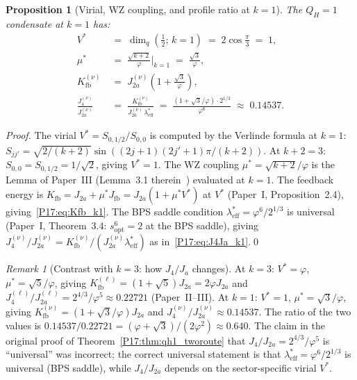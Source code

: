 \documentclass[11pt,a4paper]{article}
\newtheorem{proposition}[theorem]{Proposition}
\theoremstyle{definition}\newtheorem{definition}[theorem]{Definition}
\theoremstyle{remark}
\newtheorem{remark}[theorem]{Remark}
\newcommand{\vp}{\varphi}
\newcommand{\Ja}{J_{2a}}
\newcommand{\Jfour}{J_4}
\newcommand{\QH}{Q_H}
\begin{document}
\begin{proposition}[Virial, WZ coupling, and profile ratio at $k=1$]
\label{P17:prop:k1_virial}
The $\QH=1$ condensate at $k=1$ has:
\begin{align}
  V^* &\;=\; \dim_q\!\left(\tfrac12;\,k{=}1\right)
           \;=\; 2\cos\tfrac{\pi}{3} \;=\; 1,
  \label{P17:eq:Vstar_k1} \\
  \mu^* &\;=\; \frac{\sqrt{k+2}}{\vp}\bigg|_{k=1}
             \;=\; \frac{\sqrt{3}}{\vp},
  \label{P17:eq:mustar_k1} \\
  K_{\mathrm{fb}}^{(\nu)} &\;=\; \Ja^{(\nu)}\!\left(1+\frac{\sqrt{3}}{\vp}\right),
  \label{P17:eq:Kfb_k1} \\
  \frac{\Jfour^{(\nu)}}{\Ja^{(\nu)}}
  &\;=\; \frac{K_{\mathrm{fb}}^{(\nu)}}{\Ja^{(\nu)}\,\lambda_{\mathrm{eff}}^*}
   \;=\; \frac{(1+\sqrt{3}/\vp)\cdot2^{1/3}}{\vp^6}
   \;\approx\; 0.14537.
  \label{P17:eq:J4Ja_k1}
\end{align}
\end{proposition}

\begin{proof}
The virial $V^*=S_{0,1/2}/S_{0,0}$ is computed by the Verlinde
formula at $k=1$: $S_{jj'}=\sqrt{2/(k+2)}\sin((2j+1)(2j'+1)\pi/(k+2))$.
At $k+2=3$: $S_{0,0}=S_{0,1/2}=1/\sqrt{2}$, giving $V^*=1$.
The WZ coupling $\mu^*=\sqrt{k+2}/\vp$ is the Lemma of Paper~III
(Lemma~3.1 therein~\cite{Paper3}) evaluated at $k=1$.
The feedback energy is $K_{\mathrm{fb}}=\Ja+\mu^*J_{\mathrm{fb}}=\Ja(1+\mu^*V^*)$
at $V^*$ (Paper~I, Proposition~2.4), giving~\eqref{P17:eq:Kfb_k1}.
The BPS saddle condition $\lambda_{\mathrm{eff}}^*=\vp^6/2^{1/3}$ is universal
(Paper~I, Theorem~3.4: $s_{\mathrm{opt}}^6=2$ at the BPS saddle),
giving $\Jfour^{(\nu)}/\Ja^{(\nu)}=K_{\mathrm{fb}}^{(\nu)}/(\Ja^{(\nu)}\lambda_{\mathrm{eff}}^*)$
as in~\eqref{P17:eq:J4Ja_k1}.\qed
\end{proof}

\begin{remark}[Contrast with $k=3$: how $J_4/J_a$ changes]
\label{P17:rem:J4Ja_k1_vs_k3}
At $k=3$: $V^*=\vp$, $\mu^*=\sqrt{5}/\vp$, giving $K_{\mathrm{fb}}^{(\ell)} = (1+\sqrt{5})\Ja = 2\vp\Ja$
and $\Jfour^{(\ell)}/\Ja^{(\ell)}=2^{4/3}/\vp^5\approx0.22721$ (Paper~II--III).
At $k=1$: $V^*=1$, $\mu^*=\sqrt{3}/\vp$, giving $K_{\mathrm{fb}}^{(\nu)} = (1+\sqrt{3}/\vp)\Ja$
and $\Jfour^{(\nu)}/\Ja^{(\nu)}\approx0.14537$.
The ratio of the two values is
$0.14537/0.22721 = (\vp+\sqrt{3})/(2\vp^2)\approx0.640$.
The claim in the original proof of Theorem~\ref{P17:thm:qh1_tworoute} that
$\Jfour/\Ja=2^{4/3}/\vp^5$ is ``universal'' was incorrect;
the correct universal statement is that $\lambda_{\mathrm{eff}}^*=\vp^6/2^{1/3}$ is universal
(BPS saddle), while $\Jfour/\Ja$ depends on the sector-specific virial $V^*$.
\end{remark}
\end{document}
